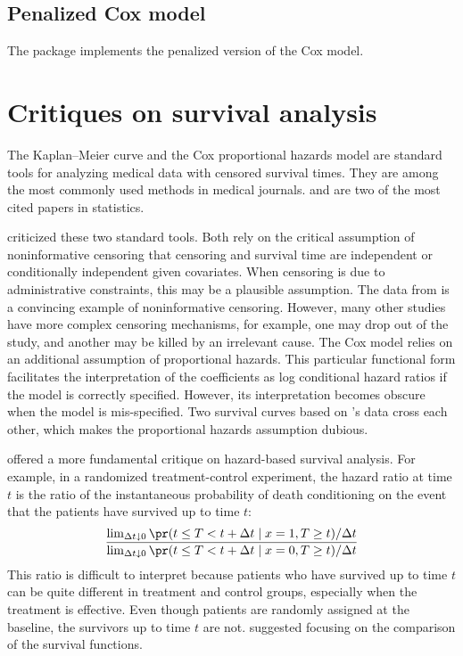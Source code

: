 \subsection{Penalized Cox model}


The  package implements the penalized version of the Cox model.   
 


\section{Critiques on survival analysis}


The Kaplan--Meier curve and the Cox proportional hazards model are standard tools for analyzing medical data with censored survival times. They are among the most commonly used methods in medical journals. \citet{kaplan1958nonparametric} and \citet{cox1972regression} are two of the most cited papers in statistics. 

\citet{freedman2008survival} criticized these two standard tools. Both rely on the critical assumption of noninformative censoring that censoring and survival time are independent or conditionally independent given covariates. When censoring is due to administrative constraints, this may be a plausible assumption. The data from \citet{lin2016simultaneous} is a convincing example of noninformative censoring.  However, many other studies have more complex censoring mechanisms, for example, one may drop out of the study, and another may be killed by an irrelevant cause. The Cox model relies on an additional assumption of proportional hazards. This particular functional form facilitates the interpretation of the coefficients as log conditional hazard ratios if the model is correctly specified. However, its interpretation becomes obscure when the model is mis-specified.  Two survival curves based on \citet{lin2016simultaneous} 's data cross each other, which makes the proportional hazards assumption dubious. 


\citet{hernan2010hazards} offered a more fundamental critique on hazard-based survival analysis. For example, in a randomized treatment-control experiment, the hazard ratio at time $t$ is the ratio of the instantaneous probability of death conditioning on the event that the patients have survived up to time $t$:
$$
\frac{   \lim_{\Delta t\downarrow0}\pr(t\leq T<t+\Delta t\mid x=1, T\geq t)/\Delta t  }
{  \lim_{\Delta t\downarrow0}\pr(t\leq T<t+\Delta t\mid x=0, T\geq t)/\Delta t  }
$$
This ratio is difficult to interpret because patients who have survived up to time $t$ can be quite different in treatment and control groups, especially when the treatment is effective. Even though patients are randomly assigned at the baseline, the survivors up to time $t$ are not. \citet{hernan2010hazards} suggested focusing on the comparison of the survival functions. 




